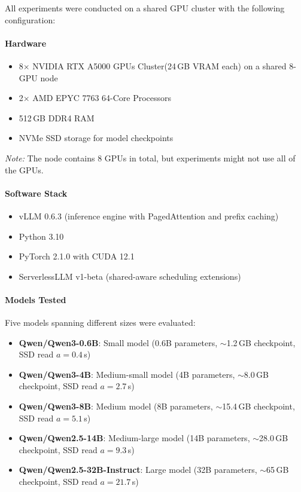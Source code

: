 \documentclass[logo,bsc,singlespacing,parskip,online]{infthesis}
\begin{document}
All experiments were conducted on a shared GPU cluster with the following configuration:

\paragraph{Hardware}
\begin{itemize}
\item 8$\times$ NVIDIA RTX A5000 GPUs Cluster(24\,GB VRAM each) on a shared 8-GPU node
\item 2$\times$ AMD EPYC 7763 64-Core Processors
\item 512\,GB DDR4 RAM
\item NVMe SSD storage for model checkpoints
\end{itemize}

\textit{Note:} The node contains 8 GPUs in total, but experiments might not use all of the GPUs.
\paragraph{Software Stack}
\begin{itemize}
\item vLLM 0.6.3 (inference engine with PagedAttention and prefix caching)
\item Python 3.10
\item PyTorch 2.1.0 with CUDA 12.1
\item ServerlessLLM v1-beta (shared-aware scheduling extensions)
\end{itemize}

\paragraph{Models Tested}
Five models spanning different sizes were evaluated:
\begin{itemize}
\item \textbf{Qwen/Qwen3-0.6B}: Small model (0.6B parameters, $\sim$1.2\,GB checkpoint, SSD read $a=0.4$\,s)
\item \textbf{Qwen/Qwen3-4B}: Medium-small model (4B parameters, $\sim$8.0\,GB checkpoint, SSD read $a=2.7$\,s)
\item \textbf{Qwen/Qwen3-8B}: Medium model (8B parameters, $\sim$15.4\,GB checkpoint, SSD read $a=5.1$\,s)
\item \textbf{Qwen/Qwen2.5-14B}: Medium-large model (14B parameters, $\sim$28.0\,GB checkpoint, SSD read $a=9.3$\,s)
\item \textbf{Qwen/Qwen2.5-32B-Instruct}: Large model (32B parameters, $\sim$65\,GB checkpoint, SSD read $a=21.7$\,s)
\end{itemize}
\end{document}
